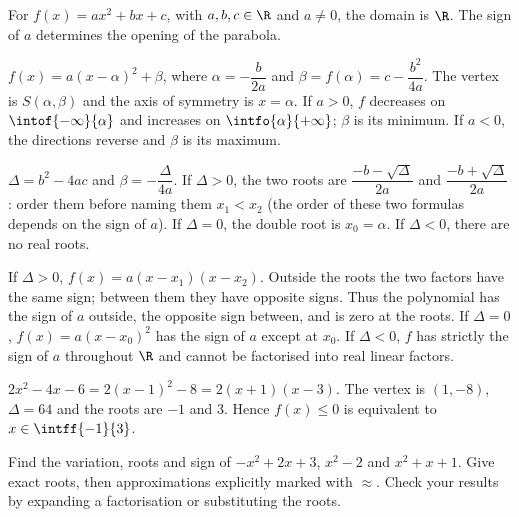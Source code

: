 
\begin{definition}
For $f(x)=ax^2+bx+c$, with $a,b,c\in\R$ and $a\neq0$, the domain is $\R$. The sign of $a$ determines the opening of the parabola.
\end{definition}

\begin{theorem}
$f(x)=a(x-\alpha)^2+\beta$, where $\alpha=-\dfrac{b}{2a}$ and $\beta=f(\alpha)=c-\dfrac{b^2}{4a}$. The vertex is $S(\alpha,\beta)$ and the axis of symmetry is $x=\alpha$. If $a>0$, $f$ decreases on $\intof{-\infty}{\alpha}$ and increases on $\intfo{\alpha}{+\infty}$; $\beta$ is its minimum. If $a<0$, the directions reverse and $\beta$ is its maximum.
\end{theorem}

\begin{theorem}
$\Delta=b^2-4ac$ and $\beta=-\dfrac{\Delta}{4a}$. If $\Delta>0$, the two roots are $\dfrac{-b-\sqrt\Delta}{2a}$ and $\dfrac{-b+\sqrt\Delta}{2a}$: order them before naming them $x_1<x_2$ (the order of these two formulas depends on the sign of $a$). If $\Delta=0$, the double root is $x_0=\alpha$. If $\Delta<0$, there are no real roots.
\end{theorem}

\begin{keypoint}
If $\Delta>0$, $f(x)=a(x-x_1)(x-x_2)$. Outside the roots the two factors have the same sign; between them they have opposite signs. Thus the polynomial has the sign of $a$ outside, the opposite sign between, and is zero at the roots. If $\Delta=0$, $f(x)=a(x-x_0)^2$ has the sign of $a$ except at $x_0$. If $\Delta<0$, $f$ has strictly the sign of $a$ throughout $\R$ and cannot be factorised into real linear factors.
\end{keypoint}

\begin{example}
$2x^2-4x-6=2(x-1)^2-8=2(x+1)(x-3)$. The vertex is $(1,-8)$, $\Delta=64$ and the roots are $-1$ and $3$. Hence $f(x)\leq0$ is equivalent to $x\in\intff{-1}{3}$.
\end{example}

\begin{figurebox}
\end{figurebox}

\begin{activity}
Find the variation, roots and sign of $-x^2+2x+3$, $x^2-2$ and $x^2+x+1$. Give exact roots, then approximations explicitly marked with $\approx$. Check your results by expanding a factorisation or substituting the roots.
\end{activity}
